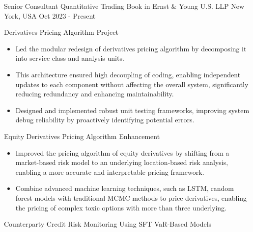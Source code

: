 

\begin{cventries}

  \cventry
    {Senior Consultant} %
    {Quantitative Trading Book in Ernst \& Young U.S. LLP} %
    {New York, USA} %
    {Oct 2023 - Present} %
    {
      \begin{cvitems}
        \item Derivatives Pricing Algorithm Project
        \begin{itemize}
          \item Led the modular redesign of derivatives pricing algorithm by decomposing it into service class and analysis units.
          \item This architecture ensured high decoupling of coding, enabling independent updates to each component without affecting the overall system, significantly reducing redundancy and enhancing maintainability.
          \item Designed and implemented robust unit testing frameworks, improving system debug reliability by proactively identifying potential errors.
        \end{itemize}
        \item Equity Derivatives Pricing Algorithm Enhancement
        \begin{itemize}
          \item Improved the pricing algorithm of equity derivatives by shifting from a market-based risk model to an underlying location-based risk analysis, enabling a more accurate and interpretable pricing framework.
          \item Combine advanced machine learning techniques, such as LSTM, random forest models with traditional MCMC methods to price derivatives, enabling the pricing of complex toxic options with more than three underlying.
        \end{itemize}
        \item Counterparty Credit Risk Monitoring Using SFT VaR-Based Models
        \begin{itemize}

\end{itemize}
\end{cvitems}}
\end{cventries}
